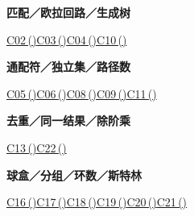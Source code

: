 \documentclass[10pt,a4paper]{article}
\begin{document}
\begin{minipage}{\linewidth}\textbf{匹配／欧拉回路／生成树}\par{\fontsize{9.5}{12}\selectfont \hyperref[C02]{C02\,(\pageref*{C02})}\hspace{.5em}\allowbreak \hyperref[C03]{C03\,(\pageref*{C03})}\hspace{.5em}\allowbreak \hyperref[C04]{C04\,(\pageref*{C04})}\hspace{.5em}\allowbreak \hyperref[C10]{C10\,(\pageref*{C10})}}\end{minipage}\par\vspace{5pt}
\begin{minipage}{\linewidth}\textbf{通配符／独立集／路径数}\par{\fontsize{9.5}{12}\selectfont \hyperref[C05]{C05\,(\pageref*{C05})}\hspace{.5em}\allowbreak \hyperref[C06]{C06\,(\pageref*{C06})}\hspace{.5em}\allowbreak \hyperref[C08]{C08\,(\pageref*{C08})}\hspace{.5em}\allowbreak \hyperref[C09]{C09\,(\pageref*{C09})}\hspace{.5em}\allowbreak \hyperref[C11]{C11\,(\pageref*{C11})}}\end{minipage}\par\vspace{5pt}
\begin{minipage}{\linewidth}\textbf{去重／同一结果／除阶乘}\par{\fontsize{9.5}{12}\selectfont \hyperref[C13]{C13\,(\pageref*{C13})}\hspace{.5em}\allowbreak \hyperref[C22]{C22\,(\pageref*{C22})}}\end{minipage}\par\vspace{5pt}
\begin{minipage}{\linewidth}\textbf{球盒／分组／环数／斯特林}\par{\fontsize{9.5}{12}\selectfont \hyperref[C16]{C16\,(\pageref*{C16})}\hspace{.5em}\allowbreak \hyperref[C17]{C17\,(\pageref*{C17})}\hspace{.5em}\allowbreak \hyperref[C18]{C18\,(\pageref*{C18})}\hspace{.5em}\allowbreak \hyperref[C19]{C19\,(\pageref*{C19})}\hspace{.5em}\allowbreak \hyperref[C20]{C20\,(\pageref*{C20})}\hspace{.5em}\allowbreak \hyperref[C21]{C21\,(\pageref*{C21})}}\end{minipage}\par\vspace{5pt}
\end{document}

